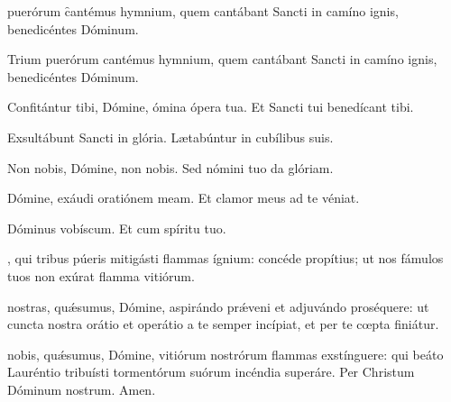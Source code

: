 \documentclass[fontsize=9pt,paper=A6,twoside,BCOR=1mm,DIV=22,headinclude]{scrarticle}
\begin{document}
\begin{multicols}{2}

{


 puerórum \f cantémus hymnium, quem cantábant Sancti in camíno ignis, benedicéntes Dóminum. \TPA 






\A Trium puerórum cantémus hymnium, quem cantábant Sancti in camíno ignis, benedicéntes Dóminum. \TPA 

\KCK 

\PNusque 

\V Confitántur tibi, Dómine, ómina ópera tua. \R Et Sancti tui benedícant tibi.

\V Exsultábunt Sancti in glória. \R Lætabúntur in cubílibus suis.

\V Non nobis, Dómine, non nobis. \R Sed nómini tuo da glóriam.

\V Dómine, exáudi oratiónem meam. \R Et clamor meus ad te véniat.

\V Dóminus vobíscum. \R Et cum spíritu tuo.

}

\oremus 

, qui tribus púeris mitigásti flammas ígnium: concéde propítius; ut nos fámulos tuos non exúrat flamma vitiórum.

 nostras, qu\'æsumus, Dómine, aspirándo pr\'æveni et adjuvándo proséquere: ut cuncta nostra orátio et operátio a te semper incípiat, et per te cœpta finiátur.

 nobis, qu\'æsumus, Dómine, vitiórum nostrórum flammas exstínguere: qui beáto Lauréntio tribuísti tormentórum suórum incéndia superáre. Per Christum Dóminum nostrum. \R Amen.

\end{multicols}

\ornamentvi
\end{document}
